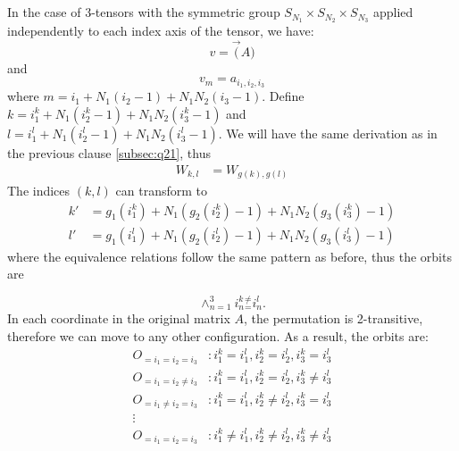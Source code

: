 \documentclass[english]{article}
\begin{document}
\subsection{~}

In the case of 3-tensors with the symmetric group $S_{N_{1}}\times S_{N_{2}}\times S_{N_{3}}$
applied independently to each index axis of the tensor, we have: 
\[
v=\vec(A)
\]
 and 
\[
v_{m}=a_{i_{1},i_{2},i_{3}}
\]
where $m=i_{1}+N_{1}(i_{2}-1)+N_{1}N_{2}(i_{3}-1)$. Define $k=i_{1}^{k}+N_{1}(i_{2}^{k}-1)+N_{1}N_{2}(i_{3}^{k}-1)$
and $l=i_{1}^{l}+N_{1}(i_{2}^{l}-1)+N_{1}N_{2}(i_{3}^{l}-1)$. We will
have the same derivation as in the previous clause \ref{subsec:q21},
thus 
\begin{align*}
W_{k,l} & =W_{g(k),g(l)}
\end{align*}
The indices $\left(k,l\right)$ can transform to 
\begin{align*}
k' & =g_{1}(i_{1}^{k})+N_{1}(g_{2}(i_{2}^{k})-1)+N_{1}N_{2}(g_{3}(i_{3}^{k})-1)\\
l' & =g_{1}(i_{1}^{l})+N_{1}(g_{2}(i_{2}^{l})-1)+N_{1}N_{2}(g_{3}(i_{3}^{l})-1)
\end{align*}
where the equivalence relations follow the same pattern as before,
thus the orbits are 

\[
\wedge_{n=1}^{3}i_{n}^{k}{}_{=}^{\neq}i_{n}^{l}.
\]
In each coordinate in the original matrix $A$, the permutation is 2-transitive,
therefore we can move to any other configuration. As a result, the orbits are:
\begin{align*}
O_{=i_{1}=i_{2}=i_{3}} & :i_{1}^{k}=i_{1}^{l},i_{2}^{k}=i_{2}^{l},i_{3}^{k}=i_{3}^{l}\\
O_{=i_{1}=i_{2}\neq i_{3}} & :i_{1}^{k}=i_{1}^{l},i_{2}^{k}=i_{2}^{l},i_{3}^{k}\neq i_{3}^{l}\\
O_{=i_{1}\neq i_{2}=i_{3}} & :i_{1}^{k}=i_{1}^{l},i_{2}^{k}\neq i_{2}^{l},i_{3}^{k}=i_{3}^{l}\\
\vdots\\
O_{=i_{1}=i_{2}=i_{3}} & :i_{1}^{k}\neq i_{1}^{l},i_{2}^{k}\neq i_{2}^{l},i_{3}^{k}\neq i_{3}^{l}
\end{align*}
\end{document}
